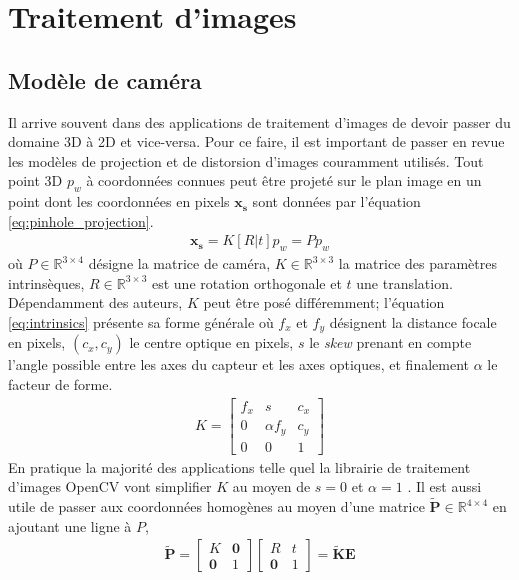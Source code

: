 \section{Traitement d'images}

\subsection{Modèle de caméra}
\label{subsec:modele_camera}
Il arrive souvent dans des applications de traitement d'images de devoir passer du domaine 3D à 2D et vice-versa. Pour ce faire, il est important de passer en revue les modèles de projection et de distorsion d'images couramment utilisés. Tout point 3D $p_w$ à coordonnées connues peut être projeté sur le plan image en un point dont les coordonnées en pixels $\boldsymbol{x_s}$ sont données par l'équation \ref{eq:pinhole_projection}.
\begin{align}
\boldsymbol{x_s} = K[R|t]p_w = P p_w
\label{eq:pinhole_projection}
\end{align}
où $P \in \mathbb{R}^{3\times 4}$ désigne la matrice de caméra, $K \in \mathbb{R}^{3\times3}$ la matrice des paramètres intrinsèques, $R\in \mathbb{R}^{3\times3}$ est une rotation orthogonale et $t$ une translation. Dépendamment des auteurs, $K$ peut être posé différemment; l'équation \ref{eq:intrinsics} présente sa forme générale où $f_x$ et $f_y$ désignent la distance focale en pixels, $(c_x, c_y)$ le centre optique en pixels, $s$ le \textit{skew} prenant en compte l'angle possible entre les axes du capteur et les axes optiques, et finalement $\alpha$ le facteur de forme.
\begin{align}
  K = \begin{bmatrix}
  f_x & s & c_x \\
  0   & \alpha f_y & c_y \\
  0  &  0  & 1
\end{bmatrix}
\label{eq:intrinsics}
\end{align}
En pratique la majorité des applications telle quel la librairie de traitement d'images OpenCV vont simplifier $K$ au moyen de $s = 0$ et $\alpha = 1$ \citep{itseez2015}. Il est aussi utile de passer aux coordonnées homogènes au moyen d'une matrice $\boldsymbol{\tilde{P}} \in \mathbb{R}^{4\times4}$ en ajoutant une ligne à $P$,
\begin{align}
  \boldsymbol{\tilde{P}} = \begin{bmatrix}K & \boldsymbol{0} \\ \boldsymbol{0} & 1\end{bmatrix}
  \begin{bmatrix}R & t \\ \boldsymbol{0} & 1\end{bmatrix} = \boldsymbol{\tilde{K}} \boldsymbol{E}
    \label{eq:homogeneous_projection}
\end{align}
